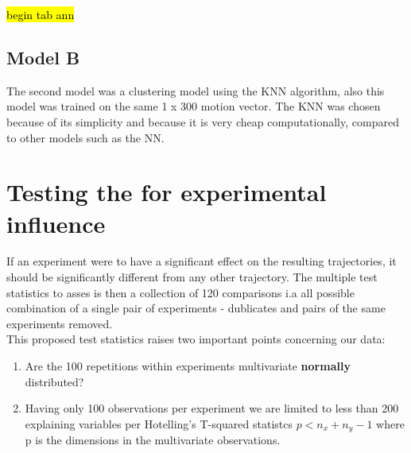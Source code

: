 \documentclass{article}
\begin{document}
\hl{begin tab ann}


\subsection{Model B}
The second model was a clustering model using the KNN algorithm, also this model was trained on the same 1 x 300 motion vector.
The KNN was chosen because of its simplicity and because it is very cheap computationally, compared to other models such as the NN.

\section{Testing the for experimental influence}
If an experiment were to have a significant effect on the resulting trajectories, it should be significantly different from any other trajectory. The multiple test statistics to asses is then a collection of 120 comparisons i.a all possible combination of a single pair of experiments - dublicates and pairs of the same experiments removed.\\ 
This proposed test statistics raises two important points concerning our data:
\begin{enumerate}
	\item  Are the 100 repetitions within experiments multivariate \textbf{normally} distributed?
	\item Having only 100 observations per experiment we are limited to less than 200 explaining variables per Hotelling's T-squared statistcs $p < n_x + n_y -1$ where p is the dimensions in the multivariate observations.
\end{enumerate}
\end{document}
